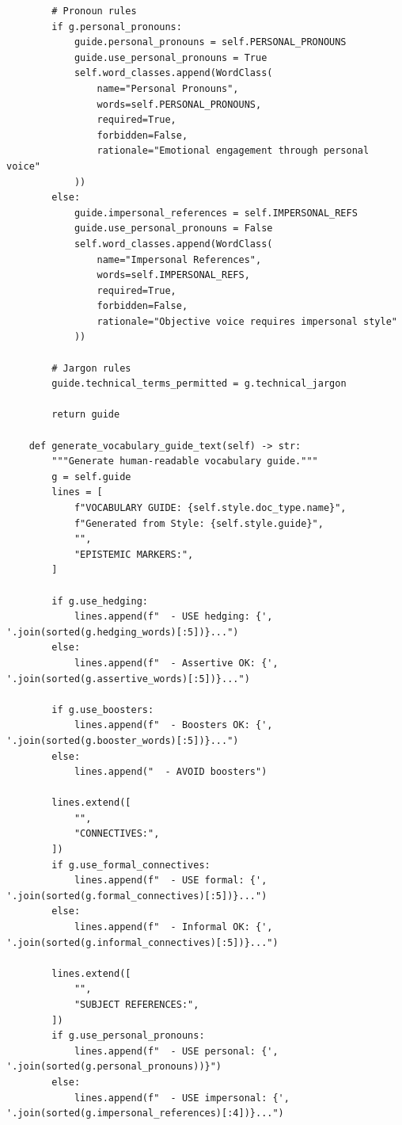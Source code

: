 \begin{verbatim}
        # Pronoun rules
        if g.personal_pronouns:
            guide.personal_pronouns = self.PERSONAL_PRONOUNS
            guide.use_personal_pronouns = True
            self.word_classes.append(WordClass(
                name="Personal Pronouns",
                words=self.PERSONAL_PRONOUNS,
                required=True,
                forbidden=False,
                rationale="Emotional engagement through personal voice"
            ))
        else:
            guide.impersonal_references = self.IMPERSONAL_REFS
            guide.use_personal_pronouns = False
            self.word_classes.append(WordClass(
                name="Impersonal References",
                words=self.IMPERSONAL_REFS,
                required=True,
                forbidden=False,
                rationale="Objective voice requires impersonal style"
            ))

        # Jargon rules
        guide.technical_terms_permitted = g.technical_jargon

        return guide

    def generate_vocabulary_guide_text(self) -> str:
        """Generate human-readable vocabulary guide."""
        g = self.guide
        lines = [
            f"VOCABULARY GUIDE: {self.style.doc_type.name}",
            f"Generated from Style: {self.style.guide}",
            "",
            "EPISTEMIC MARKERS:",
        ]

        if g.use_hedging:
            lines.append(f"  - USE hedging: {', '.join(sorted(g.hedging_words)[:5])}...")
        else:
            lines.append(f"  - Assertive OK: {', '.join(sorted(g.assertive_words)[:5])}...")

        if g.use_boosters:
            lines.append(f"  - Boosters OK: {', '.join(sorted(g.booster_words)[:5])}...")
        else:
            lines.append("  - AVOID boosters")

        lines.extend([
            "",
            "CONNECTIVES:",
        ])
        if g.use_formal_connectives:
            lines.append(f"  - USE formal: {', '.join(sorted(g.formal_connectives)[:5])}...")
        else:
            lines.append(f"  - Informal OK: {', '.join(sorted(g.informal_connectives)[:5])}...")

        lines.extend([
            "",
            "SUBJECT REFERENCES:",
        ])
        if g.use_personal_pronouns:
            lines.append(f"  - USE personal: {', '.join(sorted(g.personal_pronouns))}")
        else:
            lines.append(f"  - USE impersonal: {', '.join(sorted(g.impersonal_references)[:4])}...")


\end{verbatim}
